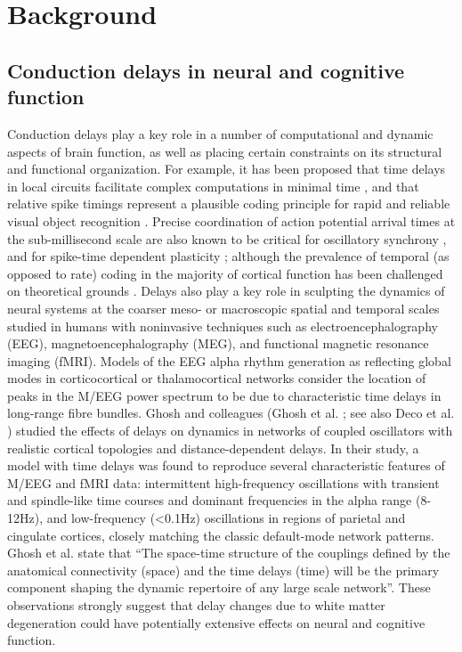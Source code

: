 \section{Background}

\subsection{Conduction delays in neural and cognitive function}




Conduction delays play a key role in a number of computational and dynamic aspects of brain function, as well as placing certain constraints on its structural and functional organization. For example, it has been proposed that time delays in local circuits facilitate complex computations in minimal time \cite{izhikevich2006polychronization}, and that relative spike timings represent a plausible coding principle for rapid and reliable visual object recognition \cite{vanrullen2002surfing}. Precise coordination of action potential arrival times at the sub-millisecond scale are also known to be critical for oscillatory synchrony \cite{fries2005a}, and for spike-time dependent plasticity 
\cite{markram1997regulation, zhang1998a}; although the prevalence of temporal (as opposed to rate) coding in the majority of cortical function has been challenged on theoretical grounds \cite{shadlen1998the}. Delays also play a key role in sculpting the dynamics of neural systems at the coarser meso- or macroscopic spatial and temporal scales studied in humans with noninvasive techniques such as electroencephalography (EEG), magnetoencephalography (MEG), and functional magnetic resonance imaging (fMRI). Models of the EEG alpha rhythm generation as reflecting global modes in corticocortical   or thalamocortical \cite{robinson2003neurophysical} networks consider the location of peaks in the M/EEG power spectrum to be due to characteristic time delays in long-range fibre bundles. Ghosh and colleagues (Ghosh et al. \cite{ghosh2008noise}; see also Deco et al. \cite{deco2009key}) studied the effects of delays on dynamics in networks of coupled oscillators with realistic cortical topologies and distance-dependent delays. In their study, a model with time delays was found to reproduce several characteristic features of M/EEG and fMRI data: intermittent high-frequency oscillations with transient and spindle-like time courses and dominant frequencies in the alpha range (8-12Hz), and low-frequency (<0.1Hz) oscillations in regions of parietal and cingulate cortices, closely matching the classic default-mode network patterns.  Ghosh et al. state that “The space-time structure of the couplings defined by the anatomical connectivity (space) and the time delays (time) will be the primary component shaping
the dynamic repertoire of any large scale network”. These observations strongly suggest that delay changes due to white matter degeneration could have potentially extensive effects on neural and cognitive function. 


